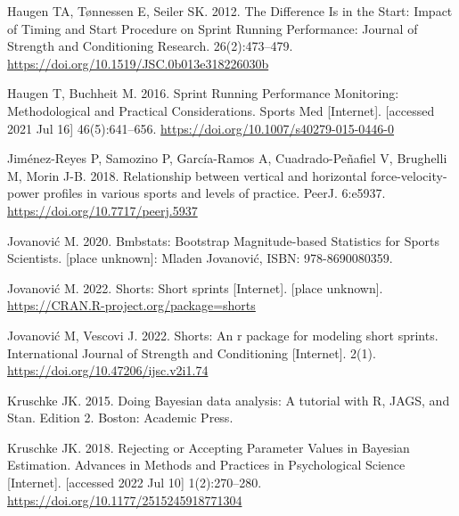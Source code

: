\documentclass[
  letterpaper,
  DIV=11,
  numbers=noendperiod]{scrartcl}
\newlength{\cslhangindent}
\newlength{\cslentryspacingunit} %
\newenvironment{CSLReferences}[2] %
 {%
  \setlength{\parindent}{0pt}
  \ifodd #1
  \let\oldpar\par
  \def\par{\hangindent=\cslhangindent\oldpar}
  \fi
  \setlength{\parskip}{#2\cslentryspacingunit}
 }%
 {}
\begin{document}
\begin{CSLReferences}{0}{0}
\leavevmode{}%
Haugen TA, Tønnessen E, Seiler SK. 2012. The {Difference Is} in the
{Start}: {Impact} of {Timing} and {Start Procedure} on {Sprint Running
Performance}: Journal of Strength and Conditioning Research.
26(2):473--479. \url{https://doi.org/10.1519/JSC.0b013e318226030b}

\leavevmode{}%
Haugen T, Buchheit M. 2016. Sprint {Running Performance Monitoring}:
{Methodological} and {Practical Considerations}. Sports Med
{[}Internet{]}. {[}accessed 2021 Jul 16{]} 46(5):641--656.
\url{https://doi.org/10.1007/s40279-015-0446-0}

\leavevmode{}%
Jiménez-Reyes P, Samozino P, García-Ramos A, Cuadrado-Peñafiel V,
Brughelli M, Morin J-B. 2018. Relationship between vertical and
horizontal force-velocity-power profiles in various sports and levels of
practice. PeerJ. 6:e5937. \url{https://doi.org/10.7717/peerj.5937}

\leavevmode{}%
Jovanović M. 2020. Bmbstats: {Bootstrap Magnitude}-based {Statistics}
for {Sports Scientists}. {[}place unknown{]}: Mladen Jovanović, ISBN:
978-8690080359.

\leavevmode{}%
Jovanović M. 2022. Shorts: Short sprints {[}Internet{]}. {[}place
unknown{]}. \url{https://CRAN.R-project.org/package=shorts}

\leavevmode{}%
Jovanović M, Vescovi J. 2022. {\textbraceleft}Shorts{\textbraceright}:
An r package for modeling short sprints. International Journal of
Strength and Conditioning {[}Internet{]}. 2(1).
\url{https://doi.org/10.47206/ijsc.v2i1.74}

\leavevmode{}%
Kruschke JK. 2015. Doing {Bayesian} data analysis: A tutorial with {R},
{JAGS}, and {Stan}. Edition 2. {Boston}: {Academic Press}.

\leavevmode{}%
Kruschke JK. 2018. Rejecting or {Accepting Parameter Values} in
{Bayesian Estimation}. Advances in Methods and Practices in
Psychological Science {[}Internet{]}. {[}accessed 2022 Jul 10{]}
1(2):270--280. \url{https://doi.org/10.1177/2515245918771304}


\end{CSLReferences}
\end{document}
